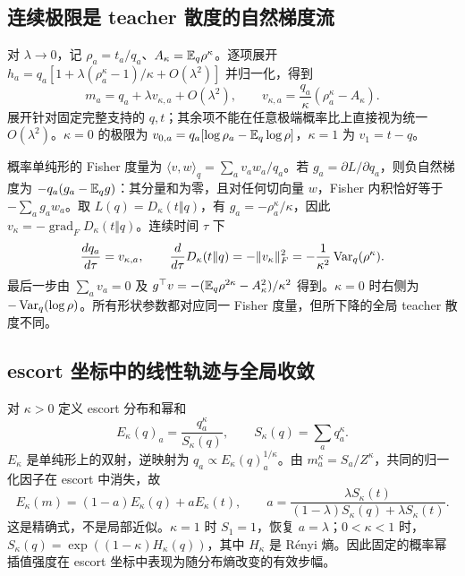 \subsection{连续极限是 teacher 散度的自然梯度流}

对 $\lambda\to0$，记 $\rho_a=t_a/q_a$、$A_\kappa=\mathbb E_q\rho^\kappa$。逐项展开 $h_a=q_a[1+\lambda(\rho_a^\kappa-1)/\kappa+O(\lambda^2)]$ 并归一化，得到
\begin{equation}
 m_a=q_a+\lambda v_{\kappa,a}+O(\lambda^2),\qquad
 v_{\kappa,a}=\frac{q_a}{\kappa}(\rho_a^\kappa-A_\kappa).
 \label{eq:proximal-natural-velocity}
\end{equation}
展开针对固定完整支持的 $q,t$；其余项不能在任意极端概率比上直接视为统一 $O(\lambda^2)$。$\kappa=0$ 的极限为 $v_{0,a}=q_a[\log\rho_a-\mathbb E_q\log\rho]$，$\kappa=1$ 为 $v_1=t-q$。

概率单纯形的 Fisher 度量为 $\langle v,w\rangle_q=\sum_av_aw_a/q_a$。若 $g_a=\partial L/\partial q_a$，则负自然梯度为 $-q_a(g_a-\mathbb E_qg)$：其分量和为零，且对任何切向量 $w$，Fisher 内积恰好等于 $-\sum_ag_aw_a$。取 $L(q)=D_\kappa(t\Vert q)$，有 $g_a=-\rho_a^\kappa/\kappa$，因此 $v_\kappa=-\operatorname{grad}_{\!F}D_\kappa(t\Vert q)$。连续时间 $\tau$ 下
\begin{equation}
 \frac{dq_a}{d\tau}=v_{\kappa,a},\qquad
 \frac{d}{d\tau}D_\kappa(t\Vert q)
 =-\|v_\kappa\|_F^2
 =-\frac1{\kappa^2}\operatorname{Var}_q(\rho^\kappa).
 \label{eq:proximal-flow-lyapunov}
\end{equation}
最后一步由 $\sum_av_a=0$ 及 $g^\top v=-(\mathbb E_q\rho^{2\kappa}-A_\kappa^2)/\kappa^2$ 得到。$\kappa=0$ 时右侧为 $-\operatorname{Var}_q(\log\rho)$。所有形状参数都对应同一 Fisher 度量，但所下降的全局 teacher 散度不同。

\subsection{escort 坐标中的线性轨迹与全局收敛}

对 $\kappa>0$ 定义 escort 分布和幂和
\begin{equation}
 E_\kappa(q)_a=\frac{q_a^\kappa}{S_\kappa(q)},\qquad
 S_\kappa(q)=\sum_aq_a^\kappa.
\end{equation}
$E_\kappa$ 是单纯形上的双射，逆映射为 $q_a\propto E_\kappa(q)_a^{1/\kappa}$。由 $m_a^\kappa=S_a/Z^\kappa$，共同的归一化因子在 escort 中消失，故
\begin{equation}
 E_\kappa(m)=(1-a)E_\kappa(q)+aE_\kappa(t),\qquad
 a=\frac{\lambda S_\kappa(t)}{(1-\lambda)S_\kappa(q)+\lambda S_\kappa(t)}.
 \label{eq:proximal-escort-step}
\end{equation}
这是精确式，不是局部近似。$\kappa=1$ 时 $S_1=1$，恢复 $a=\lambda$；$0<\kappa<1$ 时，$S_\kappa(q)=\exp((1-\kappa)H_\kappa(q))$，其中 $H_\kappa$ 是 Rényi 熵。因此固定的概率幂插值强度在 escort 坐标中表现为随分布熵改变的有效步幅。

